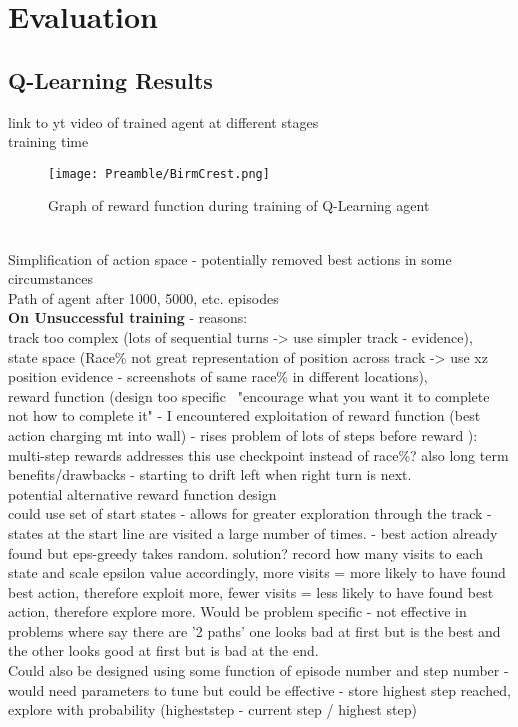 
\chapter{Evaluation}

\section{Q-Learning Results}
link to yt video of trained agent at different stages\\
training time \\
\begin{figure}
    \centering
    \texttt{[image: Preamble/BirmCrest.png]}
    \caption{Graph of reward function during training of Q-Learning agent}
    \label{fig:training-reward-q}
\end{figure}
\\Simplification of action space - potentially removed best actions in some circumstances
\\Path of agent after 1000, 5000, etc. episodes
\\ \textbf{On Unsuccessful training} - reasons: \\track too complex (lots of sequential turns -> use simpler track - evidence), \\state space (Race\% not great representation of position across track -> use xz position evidence - screenshots of same race\% in different locations), \\reward function (design too specific \cite{sutton2018reinforcement} ~"encourage what you want it to complete not how to complete it" - I encountered exploitation of reward function (best action charging mt into wall) - rises problem of lots of steps before reward \cite{mnih2013playing}): multi-step rewards addresses this use checkpoint instead of race\%? also long term benefits/drawbacks - starting to drift left when right turn is next.
\\potential alternative reward function design
\\could use set of start states - allows for greater exploration through the track - states at the start line are visited a large number of times. - best action already found but eps-greedy takes random. solution? record how many visits to each state and scale epsilon value accordingly, more visits = more likely to have found best action, therefore exploit more, fewer visits = less likely to have found best action, therefore explore more. Would be problem specific - not effective in problems where say there are '2 paths' one looks bad at first but is the best and the other looks good at first but is bad at the end. \\Could also be designed using some function of episode number and step number - would need parameters to tune but could be effective - store highest step reached, explore with probability (higheststep - current step / highest step)
